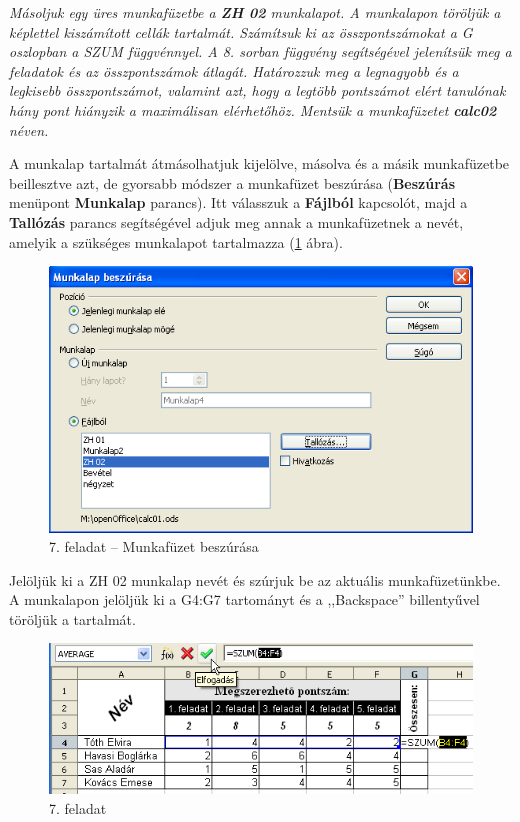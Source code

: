 {\itshape
Másoljuk egy üres munkafüzetbe a \textbf{ZH 02} munkalapot. A
munkalapon töröljük a képlettel kiszámított cellák
tartalmát. Számítsuk ki az összpontszámokat a G oszlopban a
SZUM függvénnyel. A 8. sorban függvény segítségével
jelenítsük meg a feladatok és az összpontszámok átlagát.
 Határozzuk meg a legnagyobb és a legkisebb összpontszámot,
valamint azt, hogy a legtöbb  pontszámot elért tanulónak
hány pont hiányzik a maximálisan elérhetőhöz. Mentsük a
munkafüzetet \textbf{calc02} néven.}

A munkalap tartalmát átmásolhatjuk kijelölve, másolva és a
másik munkafüzetbe beillesztve azt, de gyorsabb módszer a
munkafüzet beszúrása (\textbf{Beszúrás} menüpont
\textbf{Munkalap} parancs). Itt válasszuk a \textbf{Fájlból}
kapcsolót, majd a \textbf{Tallózás} parancs segítségével
adjuk meg annak a munkafüzetnek a  nevét, amelyik a szükséges
munkalapot tartalmazza (\ref{7-feladatMunkalap} ábra).

\begin{figure}[!h]
\begin{center}
\includegraphics[width=11.235cm]{oocalcv2-img35.png}
\caption{7. feladat --  Munkafüzet beszúrása}\label{7-feladatMunkalap}
\end{center}
\end{figure}

Jelöljük ki a ZH 02 munkalap nevét és szúrjuk be az aktuális
munkafüzetünkbe.
A munkalapon jelöljük ki a G4:G7 tartományt és a
,,Backspace'' billentyűvel
töröljük a tartalmát. 

\begin{figure}[!h]
\begin{center}
\includegraphics[width=11.288cm]{oocalcv2-img36.png}
\caption{7. feladat}\label{7-feladat}
\end{center}
\end{figure}

